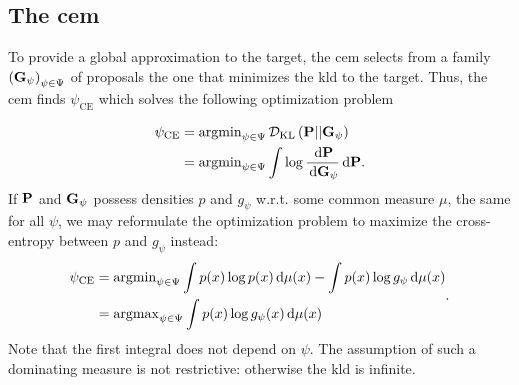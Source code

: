 \subsection{The \texorpdfstring{\Acrfull{cem}}{Cross-entropy method}}
\label{subsec:cem}
To provide a global approximation to the target, the \gls{cem}\cite{Rubinstein1999CrossEntropy,Rubinstein2004CrossEntropy} selects from a family $ \left( \G_{\psi} \right)_{\psi \in \Psi}$ of proposals the one that minimizes the \gls{kld} to the target. Thus, the \gls{cem} finds $\psi_{\text{CE}}$ which solves the following optimization problem

\begin{align*}
    \psi_{\text{CE}} &= \argmin_{\psi \in \Psi} \Dkl{\P}{\G_{\psi}} \\
    &= \argmin_{\psi \in \Psi} \int \log \frac{\d \P}{\d\G_{\psi}} \d \P.
\end{align*}
If $\P$ and $\G_{\psi}$ possess densities $p$ and $g_{\psi}$ w.r.t. some common measure $\mu$, the same for all $\psi$, we may reformulate the optimization problem to maximize the cross-entropy between $p$ and $g_{\psi}$ instead:
\begin{align}
    \begin{split}
    \psi_{\text{CE}} &= \argmin_{\psi \in \Psi} \int  p(x)\log p(x) \d \mu(x) - \int p(x)\log g_{\psi} \d \mu(x) \\ 
    &= \argmax_{\psi \in \Psi} \int p(x) \log g_{\psi}(x) \d \mu(x)
    \end{split} \label{eq:ce_argmax}.
\end{align}
Note that the first integral does not depend on $\psi$. The assumption of such a dominating measure is not restrictive: otherwise the \gls{kld} is infinite. 

